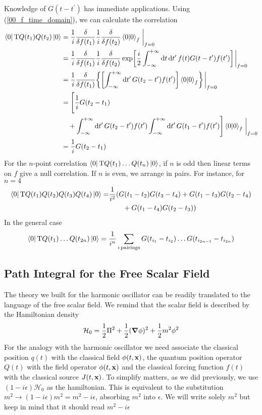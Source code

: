Knowledge of $G(t-t^\prime)$ has immediate applications. Using (\ref{00_f_time_domain}), we can calculate the correlation
\begin{equation}
    \begin{aligned}
           \bra{0}\text{T}Q(t_1) Q(t_2)\ket{0}&=\frac{1}{i}\fdv{f(t_1)}\frac{1}{i}\fdv{f(t_2)}\braket{0}_{f}\eval_{f=0}\\
           &=\frac{1}{i}\fdv{f(t_1)}\frac{1}{i}\fdv{f(t_2)}\exp[\frac{i}{2}\int_{-\infty}^{+\infty}\dd t\,\dd t^\prime\,f(t)G(t-t^\prime)f(t^\prime)]\eval_{f=0}\\
           &=\frac{1}{i}\fdv{f(t_1)}\qty{\qty[\int_{-\infty}^{+\infty}\dd t^\prime\,G(t_2-t^\prime)f(t^\prime)]\braket{0}_{f}}\eval_{f=0}\\
           &=\Bigg{[}\frac{1}{i} G(t_2-t_1)\\&\quad+\int_{-\infty}^{+\infty}\dd t^\prime\,G(t_2-t^\prime)f(t^\prime) \int_{-\infty}^{+\infty}\dd t^\prime\,G(t_1-t^\prime)f(t^\prime)\Bigg{]}\braket{0}_{f}\eval_{f=0}\\
           &=\frac{1}{i} G(t_2-t_1)
    \end{aligned}
    \label{2corellator}
\end{equation}
For the $n$-point correlation $\bra{0}\text{T}Q(t_1)\dots Q(t_n)\ket{0}$, if $n$ is odd then linear terms on $f$ give a null correlation. If $n$ is even, we arrange in pairs. For instance, for $n=4$
\begin{align}
    \bra{0}\text{T}Q(t_1) Q(t_2)Q(t_3)Q(t_4)\ket{0}=&\frac{1}{i^2}(G(t_1-t_2)G(t_3-t_4)+G(t_1-t_3)G(t_2-t_4)\nonumber\\&\qquad+G(t_1-t_4)G(t_2-t_3))
\end{align} 
In the general case
\begin{equation}
     \bra{0}\text{T}Q(t_1)\dots Q(t_{2n})\ket{0}=\frac{1}{i^n}\sum_{i\, \text{pairings}}G(t_{i_1}-t_{i_2})\dots G(t_{i_{2n-1}}-t_{i_{2n}})
\end{equation}
\subsection{Path Integral for the Free Scalar Field}
The theory we built for the harmonic oscillator can be readily translated to the language of the free scalar field.
We remind that the scalar field  is described by the Hamiltonian density
\begin{equation}
    \mathcal{H}_0=\frac{1}{2}\Pi^2+\frac{1}{2}(\grad\phi)^2+\frac{1}{2}m^2\phi^2
\end{equation}
For the analogy with the harmonic oscillator we need associate the classical position $q(t)$ with the classical field $\phi(t,\vb{x})$, the quantum position operator $Q(t)$ with the field operator $\phi(t,\vb{x})$ and the classical forcing function $f(t)$ with the classical source $J(t,\vb{x})$. To simplify matters, as we did previously, we use $(1-i\epsilon)\mathcal{H}_0$ as the hamiltonian. This is equivalent to the substitution $m^2\to(1-i\epsilon)m^2=m^2-i\epsilon$, absorbing $m^2$ into $\epsilon$. We will write solely $m^2$ but keep in mind that it should read $m^2-i\epsilon$ \\

